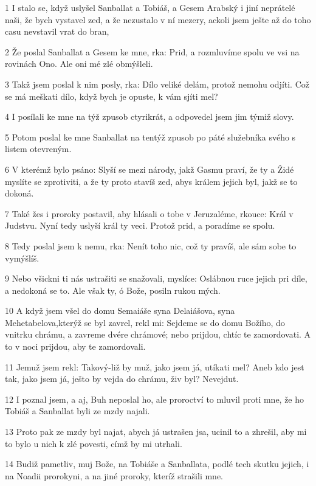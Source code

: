 \par 1 I stalo se, když uslyšel Sanballat a Tobiáš, a Gesem Arabský i jiní neprátelé naši, že bych vystavel zed, a že nezustalo v ní mezery, ackoli jsem ješte až do toho casu nevstavil vrat do bran,
\par 2 Že poslal Sanballat a Gesem ke mne, rka: Prid, a rozmluvíme spolu ve vsi na rovinách Ono. Ale oni mé zlé obmýšleli.
\par 3 Takž jsem poslal k nim posly, rka: Dílo veliké delám, protož nemohu odjíti. Což se má meškati dílo, když bych je opuste, k vám sjíti mel?
\par 4 I posílali ke mne na týž zpusob ctyrikrát, a odpovedel jsem jim týmiž slovy.
\par 5 Potom poslal ke mne Sanballat na tentýž zpusob po páté služebníka svého s listem otevreným.
\par 6 V kterémž bylo psáno: Slyší se mezi národy, jakž Gasmu praví, že ty a Židé myslíte se zprotiviti, a že ty proto stavíš zed, abys králem jejich byl, jakž se to dokoná.
\par 7 Také žes i proroky postavil, aby hlásali o tobe v Jeruzaléme, rkouce: Král v Judstvu. Nyní tedy uslyší král ty veci. Protož prid, a poradíme se spolu.
\par 8 Tedy poslal jsem k nemu, rka: Nenít toho nic, což ty pravíš, ale sám sobe to vymýšlíš.
\par 9 Nebo všickni ti nás ustrašiti se snažovali, myslíce: Oslábnou ruce jejich pri díle, a nedokoná se to. Ale však ty, ó Bože, posiln rukou mých.
\par 10 A když jsem všel do domu Semaiáše syna Delaiášova, syna Mehetabelova,kterýž se byl zavrel, rekl mi: Sejdeme se do domu Božího, do vnitrku chrámu, a zavreme dvére chrámové; nebo prijdou, chtíc te zamordovati. A to v noci prijdou, aby te zamordovali.
\par 11 Jemuž jsem rekl: Takový-liž by muž, jako jsem já, utíkati mel? Aneb kdo jest tak, jako jsem já, ješto by vejda do chrámu, živ byl? Nevejdut.
\par 12 I poznal jsem, a aj, Buh neposlal ho, ale proroctví to mluvil proti mne, že ho Tobiáš a Sanballat byli ze mzdy najali.
\par 13 Proto pak ze mzdy byl najat, abych já ustrašen jsa, ucinil to a zhrešil, aby mi to bylo u nich k zlé povesti, címž by mi utrhali.
\par 14 Budiž pametliv, muj Bože, na Tobiáše a Sanballata, podlé tech skutku jejich, i na Noadii prorokyni, a na jiné proroky, kteríž strašili mne.
